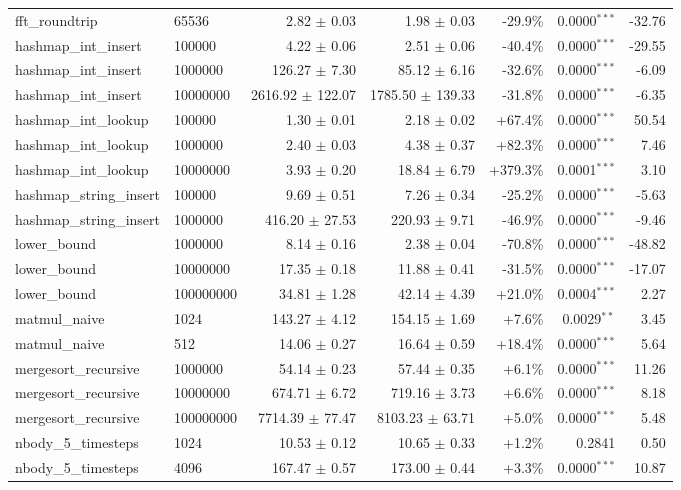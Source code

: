 \begin{table}[htbp]
\begin{tabular}{llrrrrr}
fft_roundtrip & 65536 & 2.82 $\pm$ 0.03 & 1.98 $\pm$ 0.03 & -29.9\% & 0.0000$^{***}$ & -32.76 \\
hashmap_int_insert & 100000 & 4.22 $\pm$ 0.06 & 2.51 $\pm$ 0.06 & -40.4\% & 0.0000$^{***}$ & -29.55 \\
hashmap_int_insert & 1000000 & 126.27 $\pm$ 7.30 & 85.12 $\pm$ 6.16 & -32.6\% & 0.0000$^{***}$ & -6.09 \\
hashmap_int_insert & 10000000 & 2616.92 $\pm$ 122.07 & 1785.50 $\pm$ 139.33 & -31.8\% & 0.0000$^{***}$ & -6.35 \\
hashmap_int_lookup & 100000 & 1.30 $\pm$ 0.01 & 2.18 $\pm$ 0.02 & +67.4\% & 0.0000$^{***}$ & 50.54 \\
hashmap_int_lookup & 1000000 & 2.40 $\pm$ 0.03 & 4.38 $\pm$ 0.37 & +82.3\% & 0.0000$^{***}$ & 7.46 \\
hashmap_int_lookup & 10000000 & 3.93 $\pm$ 0.20 & 18.84 $\pm$ 6.79 & +379.3\% & 0.0001$^{***}$ & 3.10 \\
hashmap_string_insert & 100000 & 9.69 $\pm$ 0.51 & 7.26 $\pm$ 0.34 & -25.2\% & 0.0000$^{***}$ & -5.63 \\
hashmap_string_insert & 1000000 & 416.20 $\pm$ 27.53 & 220.93 $\pm$ 9.71 & -46.9\% & 0.0000$^{***}$ & -9.46 \\
lower_bound & 1000000 & 8.14 $\pm$ 0.16 & 2.38 $\pm$ 0.04 & -70.8\% & 0.0000$^{***}$ & -48.82 \\
lower_bound & 10000000 & 17.35 $\pm$ 0.18 & 11.88 $\pm$ 0.41 & -31.5\% & 0.0000$^{***}$ & -17.07 \\
lower_bound & 100000000 & 34.81 $\pm$ 1.28 & 42.14 $\pm$ 4.39 & +21.0\% & 0.0004$^{***}$ & 2.27 \\
matmul_naive & 1024 & 143.27 $\pm$ 4.12 & 154.15 $\pm$ 1.69 & +7.6\% & 0.0029$^{**}$ & 3.45 \\
matmul_naive & 512 & 14.06 $\pm$ 0.27 & 16.64 $\pm$ 0.59 & +18.4\% & 0.0000$^{***}$ & 5.64 \\
mergesort_recursive & 1000000 & 54.14 $\pm$ 0.23 & 57.44 $\pm$ 0.35 & +6.1\% & 0.0000$^{***}$ & 11.26 \\
mergesort_recursive & 10000000 & 674.71 $\pm$ 6.72 & 719.16 $\pm$ 3.73 & +6.6\% & 0.0000$^{***}$ & 8.18 \\
mergesort_recursive & 100000000 & 7714.39 $\pm$ 77.47 & 8103.23 $\pm$ 63.71 & +5.0\% & 0.0000$^{***}$ & 5.48 \\
nbody_5_timesteps & 1024 & 10.53 $\pm$ 0.12 & 10.65 $\pm$ 0.33 & +1.2\% & 0.2841 & 0.50 \\
nbody_5_timesteps & 4096 & 167.47 $\pm$ 0.57 & 173.00 $\pm$ 0.44 & +3.3\% & 0.0000$^{***}$ & 10.87 \\

\end{tabular}
\end{table}
